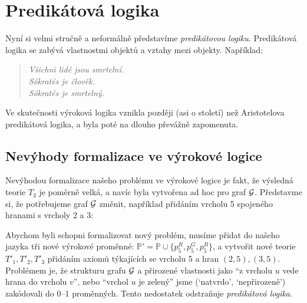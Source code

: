 \section{Predikátová logika}

Nyní si velmi stručně a neformálně představíme \emph{predikátovou logiku}. Predikátová logika se zabývá vlastnostmi objektů a vztahy mezi objekty. Například:
\begin{quote}\it
    Všichni lidé jsou smrtelní.\\
    Sókratés je člověk.\\
    Sókratés je smrtelný.
\end{quote}
Ve skutečnosti výroková logika vznikla později (asi o století) než Aristotelova predikátová logika, a byla poté na dlouho převážně zapomenuta.


\subsection{Nevýhody formalizace ve výrokové logice}\label{subsection:disadvantages-of-propositional-logic}

Nevýhodou formalizace našeho problému ve výrokové logice je fakt, že výsledná teorie \( T_3 \) je poměrně velká, a navíc byla vytvořena ad hoc pro graf  \( \mathcal{G} \). Představme si, že potřebujeme graf \( \mathcal{G} \) změnit, například přidáním vrcholu 5 spojeného hranami s vrcholy 2 a 3:

\begin{center}
\end{center}

Abychom byli schopni formalizovat nový problém, musíme přidat do našeho jazyka tři nové výrokové proměnné: \(\mathbb P'=\mathbb P \cup \{ p_5^R,p_5^G,p_5^B\} \), a vytvořit nové teorie \( T'_1, T'_2, T'_3 \) přidáním axiomů týkajících se vrcholu 5 a hran \( (2, 5), (3,5) \). Problémem je, že strukturu grafu \( \mathcal{G} \) a přirozené vlastnosti jako ``z vrcholu \(u\) vede hrana do vrcholu \(v\)'', nebo ``vrchol \(u\) je zelený'' jsme (`natvrdo', `nepřirozeně') zakódovali do 0--1 proměnných. Tento nedostatek odstraňuje \emph{predikátová logika}.

